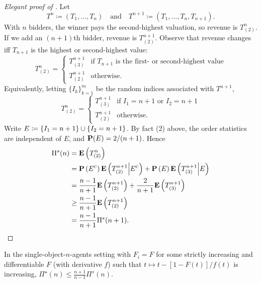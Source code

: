 \documentclass[11pt,letterpaper,reqno,oneside]{article}
\begin{document}
\begin{proof}[Elegant proof of ]
	Let
	\begin{equation*}
		T^n \coloneqq (T_1,\dots,T_n)
		\quad\text{and}\quad
		T^{n+1} \coloneqq (T_1,\dots,T_n,T_{n+1}) .
	\end{equation*}
	With $n$ bidders, the winner pays the second-highest valuation, so revenue is $T^n_{(2)}$. If we add an $(n+1)$th bidder, revenue is $T^{n+1}_{(2)}$. Observe that revenue changes iff $T_{n+1}$ is the highest or second-highest value:
	\begin{equation*}
		T_{(2)}^n =
		\begin{cases}
			T_{(3)}^{n+1}
			&\text{if $T_{n+1}$ is the first- or second-highest value}
			\\
			T_{(2)}^{n+1}
			&\text{otherwise} .
		\end{cases}
	\end{equation*}
	Equivalently, letting $\{ I_k \}_{k=1}^m$ be the random indices associated with $T^{n+1}$,
	\begin{equation*}
		T_{(2)}^n =
		\begin{cases}
			T_{(3)}^{n+1}
			&\text{if $I_1 = n+1$ or $I_2 = n+1$}
			\\
			T_{(2)}^{n+1}
			&\text{otherwise} .
		\end{cases}
	\end{equation*}	
	Write $E \coloneqq \left\{ I_1 = n+1 \right\} \cup \left\{ I_2 = n+1 \right\}$. By fact (2) above, the order statistics are independent of $E$, and $\mathbf{P}(E)=2/(n+1)$. Hence
	\begin{align*}
		\Pi^s(n)
		={}& \mathbf{E}\left( T^n_{(2)} \right)
		\\
		={}& \mathbf{P}\left( E^{\textsc{c}} \right)
		\mathbf{E}\left( T^{n+1}_{(2)} \middle| E^{\textsc{c}} \right)
		+ \mathbf{P}\left( E \right)
		\mathbf{E}\left( T^{n+1}_{(3)} \middle| E \right)
		\\
		={}& \frac{n-1}{n+1}
		\mathbf{E}\left( T^{n+1}_{(2)} \right)
		+ \frac{2}{n+1}
		\mathbf{E}\left( T^{n+1}_{(3)} \right)
		\\
		\geq{}& \frac{n-1}{n+1}
		\mathbf{E}\left( T^{n+1}_{(2)} \right)
		\\
		={}& \frac{n-1}{n+1} \Pi^s(n+1) . \qedhere
	\end{align*}
\end{proof}


\begin{corollary}
	In the single-object-$n$-agents setting with $F_i=F$ for some strictly increasing and differentiable $F$ (with derivative $f$) such that $t \mapsto t - [1-F(t)] / f(t)$ is increasing, $\Pi^\star(n) \leq \frac{n+1}{n-1} \Pi^s(n)$.
\end{corollary}
\end{document}
